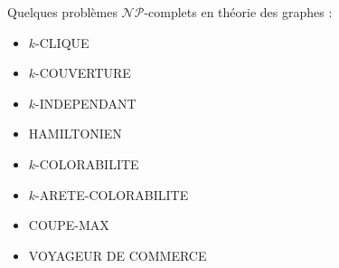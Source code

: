 \begin{myexem}
  Quelques problèmes $\mathcal{NP}$-complets en théorie des graphes :
  \begin{itemize}
    \item $k$-CLIQUE
    \item $k$-COUVERTURE
    \item $k$-INDEPENDANT
    \item HAMILTONIEN
    \item $k$-COLORABILITE
    \item $k$-ARETE-COLORABILITE
    \item COUPE-MAX
    \item VOYAGEUR DE COMMERCE
  \end{itemize}
\end{myexem}
